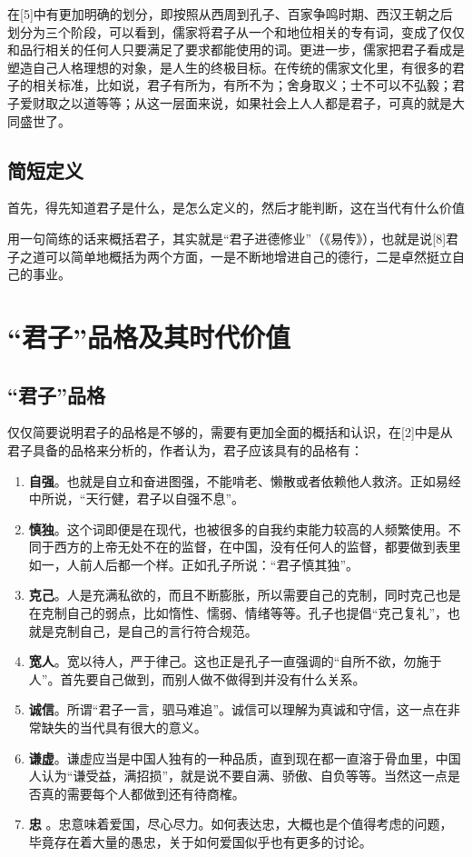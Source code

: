 \documentclass[]{article}
\begin{document}
在{[}5{]}中有更加明确的划分，即按照从西周到孔子、百家争鸣时期、西汉王朝之后划分为三个阶段，可以看到，儒家将君子从一个和地位相关的专有词，变成了仅仅和品行相关的任何人只要满足了要求都能使用的词。更进一步，儒家把君子看成是塑造自己人格理想的对象，是人生的终极目标。在传统的儒家文化里，有很多的君子的相关标准，比如说，君子有所为，有所不为；舍身取义；士不可以不弘毅；君子爱财取之以道等等；从这一层面来说，如果社会上人人都是君子，可真的就是大同盛世了。

\hypertarget{header-n21}{%
\subsection{简短定义}\label{header-n21}}

首先，得先知道君子是什么，是怎么定义的，然后才能判断，这在当代有什么价值

用一句简练的话来概括君子，其实就是``君子进德修业''（《易传》），也就是说{[}8{]}君子之道可以简单地概括为两个方面，一是不断地增进自己的德行，二是卓然挺立自己的事业。

\hypertarget{header-n26}{%
\section{``君子''品格及其时代价值}\label{header-n26}}

\hypertarget{header-n27}{%
\subsection{``君子''品格}\label{header-n27}}

仅仅简要说明君子的品格是不够的，需要有更加全面的概括和认识，在{[}2{]}中是从君子具备的品格来分析的，作者认为，君子应该具有的品格有：

\begin{enumerate}
\def\labelenumi{\arabic{enumi}.}
\item
  \textbf{自强}。也就是自立和奋进图强，不能啃老、懒散或者依赖他人救济。正如易经中所说，``天行健，君子以自强不息''。
\item
  \textbf{慎独}。这个词即便是在现代，也被很多的自我约束能力较高的人频繁使用。不同于西方的上帝无处不在的监督，在中国，没有任何人的监督，都要做到表里如一，人前人后都一个样。正如孔子所说：``君子慎其独''。
\item
  \textbf{克己}。人是充满私欲的，而且不断膨胀，所以需要自己的克制，同时克己也是在克制自己的弱点，比如惰性、懦弱、情绪等等。孔子也提倡``克己复礼''，也就是克制自己，是自己的言行符合规范。
\item
  \textbf{宽人}。宽以待人，严于律己。这也正是孔子一直强调的``自所不欲，勿施于人''。首先要自己做到，而别人做不做得到并没有什么关系。
\item
  \textbf{诚信}。所谓``君子一言，驷马难追''。诚信可以理解为真诚和守信，这一点在非常缺失的当代具有很大的意义。
\item
  \textbf{谦虚}。谦虚应当是中国人独有的一种品质，直到现在都一直溶于骨血里，中国人认为``谦受益，满招损''，就是说不要自满、骄傲、自负等等。当然这一点是否真的需要每个人都做到还有待商榷。
\item
  \textbf{忠}
  。忠意味着爱国，尽心尽力。如何表达忠，大概也是个值得考虑的问题，毕竟存在着大量的愚忠，关于如何爱国似乎也有更多的讨论。
\end{enumerate}
\end{document}
